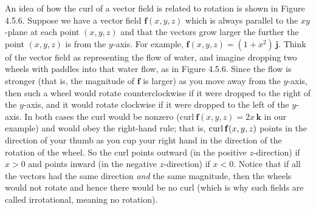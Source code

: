An idea of how the curl of a vector field is related to rotation is shown in Figure 4.5.6. Suppose we have a
vector field $\mathbf{f}(x,y,z)$ which is always parallel to the $xy$-plane at each point $(x,y,z)$ and that
the vectors grow larger the further the point $(x,y,z)$ is from the $y$-axis. For example, $\mathbf{f}(x,y,z) =
(1+x^2 )\,\mathbf{j}$. Think of the vector field as representing the flow of water, and imagine dropping
two wheels with paddles into that water flow, as in Figure 4.5.6. 
Since the flow is stronger 
(that is, the magnitude of $\mathbf{f}$ is larger) as you move away from the $y$-axis, then such a wheel would rotate counterclockwise
if it were dropped to the
right of the $y$-axis, and it would rotate clockwise if it were dropped to the left of the $y$-axis. In both cases the
curl would be nonzero ($\text{curl}~\mathbf{f}(x,y,z) = 2x\,\mathbf{k}$ in our example) and would obey the right-hand rule; 
that is, $\mathop{\mathrm{curl}}\nolimits\mathbf{f}(x,y,z)$ points in the direction of your thumb as you cup your right hand in the
direction of the rotation of the wheel. 
So the curl points outward (in the positive $z$-direction) if $x > 0$ and points
inward (in the negative $z$-direction) if $x < 0$. Notice that if all the vectors had the same direction \emph{and} the
same magnitude, then the wheels would not rotate and hence there would be no curl (which is why such fields are
called irrotational, meaning no rotation).

